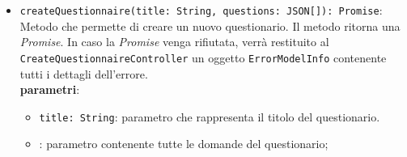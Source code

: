 \begin{itemize}
	\item \texttt{createQuestionnaire(title: String, questions: JSON[]): Promise}: \\ Metodo che permette di creare un nuovo questionario. Il metodo ritorna una \textit{Promise}. In caso la \textit{Promise} venga rifiutata, verrà restituito al \texttt{CreateQuestionnaireController} un oggetto \texttt{ErrorModelInfo} contenente tutti i dettagli dell'errore. \\
	\textbf{parametri}:
	\begin{itemize}
		\item \texttt{title: String}: parametro che rappresenta il titolo del questionario.
		\item \texttt{}: parametro contenente tutte le domande del questionario;
	\end{itemize}
\end{itemize}

